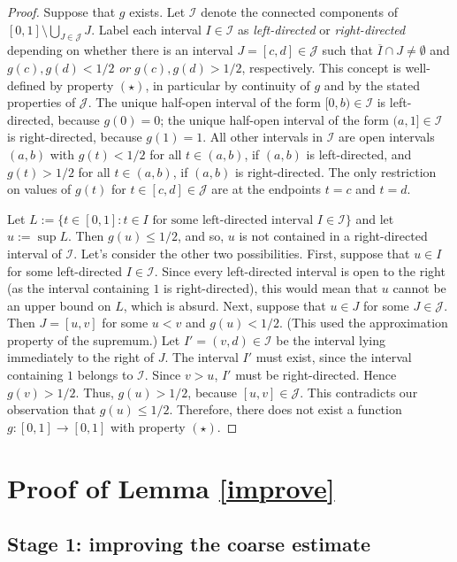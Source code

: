 \documentclass[12pt]{amsart}
\numberwithin{equation}{section}
\theoremstyle{plain}
\theoremstyle{definition}
\numberwithin{figure}{section}
\begin{document}
\begin{proof} Suppose that $g$ exists. Let $\mathcal{I}$ denote the connected components of $[0,1]\setminus\bigcup_{J\in\mathcal{J}}J$. Label each interval $I\in\mathcal{I}$ as \emph{left-directed} or \emph{right-directed} depending on whether there is an interval $J=[c,d]\in\mathcal{J}$ such that $\overline{I}\cap J\neq\emptyset$ and $g(c),g(d)<1/2$ \emph{or} $g(c),g(d)>1/2$, respectively. This concept is well-defined by property $(\star)$, in particular by continuity of $g$ and by the stated properties of $\mathcal{J}$. The unique half-open interval of the form $[0,b)\in\mathcal{I}$ is left-directed, because $g(0)=0$; the unique half-open interval of the form $(a,1]\in\mathcal{I}$ is right-directed, because $g(1)=1$. All other intervals in $\mathcal{I}$ are open intervals $(a,b)$ with $g(t)<1/2$ for all $t\in(a,b)$, if $(a,b)$ is left-directed, and $g(t)>1/2$ for all $t\in(a,b)$, if $(a,b)$ is right-directed. The only restriction on values of $g(t)$ for $t\in[c,d]\in\mathcal{J}$ are at the endpoints $t=c$ and $t=d$.

Let $L:=\{t\in[0,1]:t\in I\text{ for some left-directed interval }I\in\mathcal{I}\}$ and let $u:=\sup L$. Then $g(u)\leq 1/2$, and so, $u$ is not contained in a right-directed interval of $\mathcal{I}$. Let's consider the other two possibilities. First, suppose that $u\in I$ for some left-directed $I\in\mathcal{I}$. Since every left-directed interval is open to the right (as the interval containing $1$ is right-directed), this would mean that $u$ cannot be an upper bound on $L$, which is absurd. Next, suppose that $u\in J$ for some $J\in\mathcal{J}$. Then $J=[u,v]$ for some $u<v$ and $g(u)<1/2$. (This used the approximation property of the supremum.) Let $I'=(v,d)\in\mathcal{I}$ be the interval lying immediately to the right of $J$. The interval $I'$ must exist, since the interval containing $1$ belongs to $\mathcal{I}$. Since $v>u$, $I'$ must be right-directed. Hence $g(v)>1/2$. Thus, $g(u)>1/2$, because $[u,v]\in\mathcal{J}$. This contradicts our observation that $g(u)\leq 1/2$. Therefore, there does not exist a function $g:[0,1]\rightarrow[0,1]$ with property $(\star)$.\end{proof}

\section{Proof of Lemma \ref{improve}}\label{proof-I}

\subsection{Stage 1: improving the coarse estimate}
\end{document}

